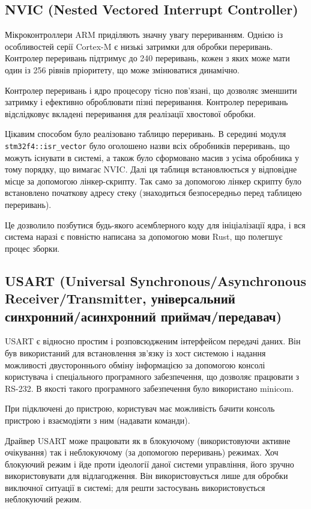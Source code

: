 \documentclass[oneside,14pt,a4paper,final]{myextreport}
\newcommand\code[1]{{\tt #1}}
\begin{document}
\subsection{NVIC (Nested Vectored Interrupt Controller)}

Мікроконтроллери ARM приділяють значну увагу перериванням. Однією із особливостей серії Cortex-M є низькі затримки для обробки переривань. Контролер переривань підтримує до 240 переривань\cite{cortex-m:nvic}, кожен з яких може мати один із 256 рівнів пріоритету, що може змінюватися динамічно.

Контролер переривань і ядро процесору тісно пов'язані, що дозволяє зменшити затримку і ефективно оброблювати пізні переривання. Контролер переривань відслідковує вкладені переривання для реалізації хвостової обробки.

Цікавим способом було реалізовано таблицю переривань. В середині модуля \code{stm32f4::isr\_vector} було оголошено назви всіх обробників переривань, що можуть існувати в системі, а також було сформовано масив з усіма обробника у тому порядку, що вимагає NVIC. Далі ця таблиця встановлюється у відповідне місце за допомогою лінкер-скрипту. Так само за допомогою лінкер скрипту було встановлено початкову адресу стеку (знаходиться безпосередньо перед таблицею переривань).

Це дозволило позбутися будь-якого асемблерного коду для ініціалізації ядра, і вся система наразі є повністю написана за допомогою мови Rust, що полегшує процес зборки.

\subsection{\nohyphens{USART (Universal Synchronous/\-Asynchronous Receiver/\-Transmitter, універсальний синхронний/\-асинхронний приймач/\-передавач)}}

  USART є відносно простим і розповсюдженим інтерфейсом передачі даних. Він був використаний для встановлення зв'язку із хост системою і надання можливості двустороннього обміну інформацією за допомогою консолі користувача і спеціального програмного забезпечення, що дозволяє працювати з RS-232. В якості такого програмного забезпечення було використано minicom.

  При підключені до пристрою, користувач має можливість бачити консоль пристрою і взаємодіяти з ним (надавати команди).

  Драйвер USART може працювати як в блокуючому (використовуючи активне очікування) так і неблокуючому (за допомогою переривань) режимах. Хоч блокуючий режим і йде проти ідеології даної системи управління, його зручно використовувати для відлагодження. Він використовується лише для обробки виключної ситуації в системі; для решти застосувань використовується неблокуючий режим.
\end{document}
